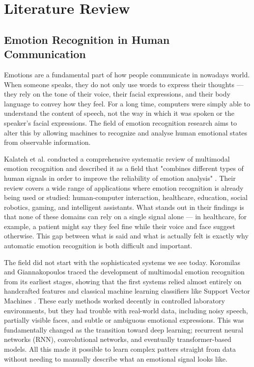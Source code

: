 
\chapter{Literature Review}
\label{chap:literature_review}

\setlength{\parskip}{1em}

\section{Emotion Recognition in Human Communication}

Emotions are a fundamental part of how people communicate in nowadays world. When someone speaks, they do not only use words to express their thoughts — they rely on the tone of their voice, their facial expressions, and their body language to convey how they feel. For a long time, computers were simply able to understand the content of speech, not the way in which it was spoken or the speaker's facial expressions. The field of emotion recognition research aims to alter this by allowing machines to recognize and analyse human emotional states from observable information.
 
Kalateh et al. conducted a comprehensive systematic review of multimodal emotion recognition and described it as a field that "combines different types of human signals in order to improve the reliability of emotion analysis" \cite{kalateh2024systematic}. Their review covers a wide range of applications where emotion recognition is already being used or studied: human-computer interaction, healthcare, education, social robotics, gaming, and intelligent assistants. What stands out in their findings is that none of these domains can rely on a single signal alone — in healthcare, for example, a patient might say they feel fine while their voice and face suggest otherwise. This gap between what is said and what is actually felt is exactly why automatic emotion recognition is both difficult and important.
 
The field did not start with the sophisticated systems we see today. Koromilas and Giannakopoulos traced the development of multimodal emotion recognition from its earliest stages, showing that the first systems relied almost entirely on handcrafted features and classical machine learning classifiers like Support Vector Machines \cite{koromilas2021deep}. These early methods worked decently in controlled laboratory environments, but they had trouble with real-world data, including noisy speech, partially visible faces, and subtle or ambiguous emotional expressions. This was fundamentally changed as the transition toward deep learning; recurrent neural networks (RNN), convolutional networks, and eventually transformer-based models. All this made it possible to learn complex patters straight from data without needing to manually describe what an emotional signal looks like.

